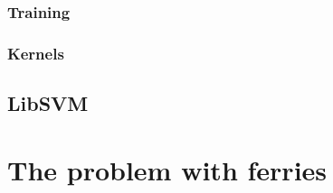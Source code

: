 \documentclass[11pt]{article} %
\begin{document}
\subsubsection{Training}
\label{sec:training}
% 

% 

% 
% 
% 

\subsubsection{Kernels}
\label{sec:kernels}
% 
% 

\subsection{LibSVM}
\label{sec:libsvm}
% 
% 
%
\section{The problem with ferries}
\label{sec:problem}
% 
\end{document}
